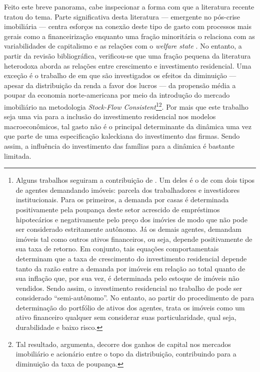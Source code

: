 Feito este breve panorama, cabe inspecionar a forma com que a literatura recente tratou do tema. 
Parte significativa desta literatura  --- emergente no pós-crise imobiliária --- centra esforços na conexão deste tipo de gasto com processos mais gerais como a financeirização \cites{aalbers_financialization_2008}{bibow_financialization_2010}
enquanto uma fração minoritária o relaciona com as variabilidades
de capitalismo e as relações com o \textit{welfare state} \cite{schwartz_politics_2009}. No
entanto, a partir da revisão bibliográfica, verificou-se que uma fração pequena da literatura heterodoxa aborda as relações entre crescimento e investimento residencial.
Uma exceção é o trabalho de \textcite{zezza_u.s._2008} em que são investigados os efeitos da diminuição --- apesar da distribuição da renda a favor dos lucros --- da propensão média a poupar da economia norte-americana por meio da introdução do mercado imobiliário na metodologia \textit{Stock-Flow Consistent}\footnote{
	Alguns trabalhos seguiram a contribuição de \textcite{zezza_u.s._2008}.
	Um deles é o de \textcite{nikolaidi_securitisation_2015} com dois tipos de agentes demandando imóveis: parcela dos trabalhadores e investidores institucionais.
	Para os primeiros, a demanda por casas é determinada positivamente pela poupança deste setor acrescido de empréstimos hipotecários e negativamente pelo preço dos imóvies de modo que não pode ser considerado estritamente autônomo.
	Já os demais agentes, demandam imóveis tal como outros ativos financeiros, ou seja, depende positivamente de sua taxa de retorno.
	Em conjunto, tais equações comportamentais determinam que a taxa de crescimento do investimento residencial depende tanto da razão entre a demanda por imóveis em relação ao total quanto de sua inflação que, por sua vez, é determinada pelo estoque de imóveis não vendidos.
	Sendo assim, o investimento residencial no trabalho de \textcite{nikolaidi_securitisation_2015} pode ser considerado ``semi-autônomo''.
	No entanto, ao partir do procedimento de \textcite{godley_money_1999} para determinação do portfólio de ativos dos agentes, trata os imóveis como um ativo financeiro qualquer sem considerar suas particularidade, qual seja, durabilidade e baixo risco.
}\footnote{
	Tal resultado, argumenta, decorre dos ganhos de capital nos mercados imobiliário e acionário entre o topo da distribuição, contribuindo para a diminuição da taxa de poupança.
}. 
Por mais que este trabalho seja uma via para a inclusão do investimento residencial nos modelos macroeconômicos, tal gasto não é o principal determinante da dinâmica uma vez que parte de uma especificação kaleckiana do investimento das firmas.
Sendo assim, a influência do investimento das famílias para a dinâmica é bastante limitada.

